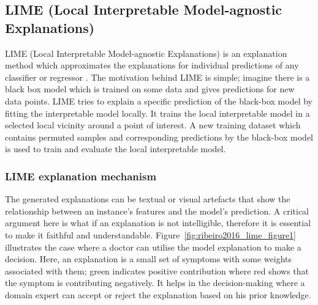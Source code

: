 \documentclass[english]{tktltiki2}
\theoremstyle{definition}
\theoremstyle{remark}
\begin{document}
\subsection{ LIME (Local Interpretable Model-agnostic Explanations)}\label{sec:LIME} %
LIME (Local Interpretable Model-agnostic Explanations) is an explanation method which approximates the explanations for individual predictions of any classifier or regressor \citep{ribeiro2016should}. The motivation behind LIME is simple; imagine there is a black box model which is trained on some data and gives predictions for new data points. LIME tries to explain a specific prediction of the black-box model by fitting the interpretable model locally. It trains the local interpretable model in a selected local vicinity around a point of interest. A new training dataset which contains permuted samples and corresponding predictions by the black-box model is used to train and evaluate the local interpretable model. 

\subsubsection{LIME explanation mechanism} %
The generated explanations can be textual or visual artefacts that show the relationship between an instance's features and the model's prediction. A critical argument here is what if an explanation is not intelligible, therefore it is essential to make it faithful and understandable. Figure~\ref{fig:ribeiro2016_lime_figure1} illustrates the case where a doctor can utilise the model explanation to make a decision. Here, an explanation is a small set of symptoms with some weights associated with them; green indicates positive contribution where red shows that the symptom is contributing negatively. It helps in the decision-making where a domain expert can accept or reject the explanation based on his prior knowledge.
\end{document}
